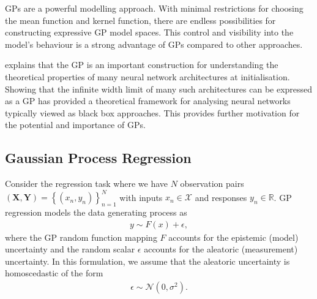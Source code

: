 \documentclass{article}
\numberwithin{equation}{section}
\begin{document}
GPs are a powerful modelling approach. With minimal restrictions for choosing the mean function and kernel function, there are endless possibilities for constructing expressive GP model spaces.
This control and visibility into the model's behaviour is a strong advantage of GPs compared to other approaches.

\cite{novak2019neural} explains that the GP is an important construction for understanding the theoretical properties of many neural network architectures at initialisation.
Showing that the infinite width limit of many such architectures can be expressed as a GP has provided a theoretical framework for analysing neural networks typically viewed as black box approaches.
This provides further motivation for the potential and importance of GPs.

\subsection{Gaussian Process Regression}
Consider the regression task where we have $N$ observation pairs $(\mathbf{X}, \mathbf{Y}) = \left\{(x_n, y_n)\right\}_{n=1}^{N}$ with inputs $x_n \in \mathcal{X}$ and responses $y_n \in \mathbb{R}$. GP regression models the data generating process as
\begin{align}
    y \sim F(x) + \epsilon,
    \label{regression-data-uncertainties}
\end{align}
where the GP random function mapping $F$ accounts for the epistemic (model) uncertainty and the random scalar $\epsilon$ accounts for the aleatoric (measurement) uncertainty. In this formulation, we assume that the aleatoric uncertainty is homoscedastic of the form
\begin{align}
    \epsilon \sim \mathcal{N} \left(0, \sigma^2\right).
    \label{aleotric-uncertainty}
\end{align}
\end{document}
